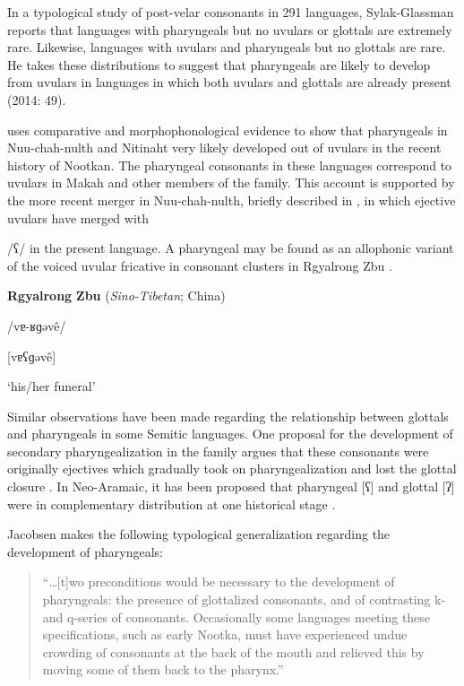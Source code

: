   In a typological study of post-velar consonants in 291 languages, Sylak-Glassman reports that languages with pharyngeals but no uvulars or glottals are extremely rare. Likewise, languages with uvulars and pharyngeals but no glottals are rare. He takes these distributions to suggest that pharyngeals are likely to develop from uvulars in languages in which both uvulars and glottals are already present (2014: 49).

  \citet{Jacobsen1969} uses comparative and morphophonological evidence to show that pharyngeals in Nuu-chah-nulth and Nitinaht very likely developed out of uvulars in the recent history of Nootkan. The pharyngeal consonants in these languages correspond to uvulars in Makah and other members of the family. This account is supported by the more recent merger in Nuu-chah-nulth, briefly described in , in which ejective uvulars have merged with 

/ʕ/ in the present language. A pharyngeal may be found as an allophonic variant of the voiced uvular fricative in consonant clusters in Rgyalrong Zbu .

\ea\label{ex:(4.47)}
  \textbf{Rgyalrong} \textbf{Zbu} (\textit{Sino-Tibetan}; China)

/vɐ-ʁɡəvê/

[vɐʕɡəvê]

\glt ‘his/her funeral’

\citep[62]{Gong2018}

\z

  Similar observations have been made regarding the relationship between glottals and pharyngeals in some Semitic languages. One proposal for the development of secondary pharyngealization in the family argues that these consonants were originally ejectives which gradually took on pharyngealization and lost the glottal closure \citep{Zemánek1996}. In Neo-Aramaic, it has been proposed that pharyngeal [ʕ] and glottal [ʔ] were in complementary distribution at one historical stage \citep{Hoberman1985}.

  Jacobsen makes the following typological generalization regarding the development of pharyngeals:

\begin{quote}
“…[t]wo preconditions would be necessary to the development of pharyngeals: the presence of glottalized consonants, and of contrasting k- and q-series of consonants. Occasionally some languages meeting these specifications, such as early Nootka, must have experienced undue crowding of consonants at the back of the mouth and relieved this by moving some of them back to the pharynx.” 

\citep[152]{Jacobsen1969}
\end{quote}

